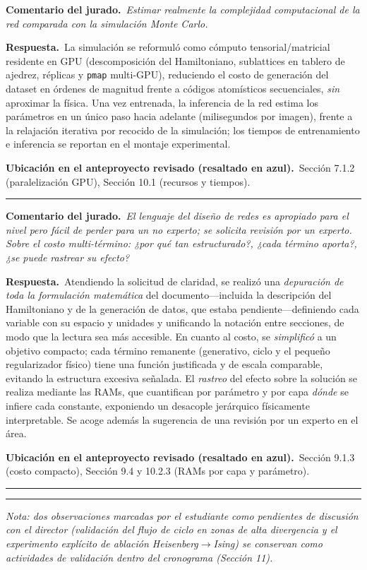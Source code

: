 \documentclass[11pt]{article}
\newcommand{\comentario}[1]{\par\smallskip\noindent\textbf{\color{jgris}Comentario del jurado.}\ \textit{#1}\par}
\newcommand{\respuesta}[1]{\par\smallskip\noindent\textbf{\color{jverde}Respuesta.}\ #1\par}
\newcommand{\ubic}[1]{\par\smallskip\noindent\textbf{\color{jazul}Ubicación en el anteproyecto revisado (resaltado en azul).}\ #1\par\medskip\hrule\medskip}
\begin{document}
\comentario{Estimar realmente la complejidad computacional de la red comparada con la simulación Monte Carlo.}
\respuesta{La simulación se reformuló como cómputo tensorial/matricial residente en GPU (descomposición del Hamiltoniano, sublattices en tablero de ajedrez, réplicas y \texttt{pmap} multi-GPU), reduciendo el costo de generación del dataset en órdenes de magnitud frente a códigos atomísticos secuenciales, \emph{sin} aproximar la física. Una vez entrenada, la inferencia de la red estima los parámetros en un único paso hacia adelante (milisegundos por imagen), frente a la relajación iterativa por recocido de la simulación; los tiempos de entrenamiento e inferencia se reportan en el montaje experimental.}
\ubic{Sección 7.1.2 (paralelización GPU), Sección 10.1 (recursos y tiempos).}

\comentario{El lenguaje del diseño de redes es apropiado para el nivel pero fácil de perder para un no experto; se solicita revisión por un experto. Sobre el costo multi-término: ¿por qué tan estructurado?, ¿cada término aporta?, ¿se puede rastrear su efecto?}
\respuesta{Atendiendo la solicitud de claridad, se realizó una \emph{depuración de toda la formulación matemática} del documento---incluida la descripción del Hamiltoniano y de la generación de datos, que estaba pendiente---definiendo cada variable con su espacio y unidades y unificando la notación entre secciones, de modo que la lectura sea más accesible. En cuanto al costo, se \emph{simplificó} a un objetivo compacto; cada término remanente (generativo, ciclo y el pequeño regularizador físico) tiene una función justificada y de escala comparable, evitando la estructura excesiva señalada. El \emph{rastreo} del efecto sobre la solución se realiza mediante las RAMs, que cuantifican por parámetro y por capa \emph{dónde} se infiere cada constante, exponiendo un desacople jerárquico físicamente interpretable. Se acoge además la sugerencia de una revisión por un experto en el área.}
\ubic{Sección 9.1.3 (costo compacto), Sección 9.4 y 10.2.3 (RAMs por capa y parámetro).}

\bigskip\hrule\medskip
\noindent\small\textit{Nota: dos observaciones marcadas por el estudiante como pendientes de discusión con el director (validación del flujo de ciclo en zonas de alta divergencia y el experimento explícito de ablación Heisenberg$\to$Ising) se conservan como actividades de validación dentro del cronograma (Sección 11).}
\end{document}
